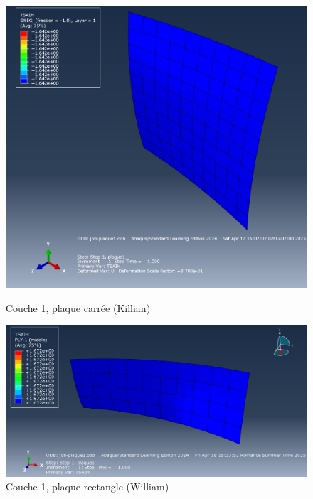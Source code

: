 \documentclass[a4paper,12pt]{article}
\begin{document}
\begin{figure}[h!]
	\centering
	\begin{minipage}[t][0.3\textheight]{0.495\textwidth}
		\centering
		\includegraphics[width=\textwidth]{media/K_P1_L1_12042025.png} %
		\caption{Couche 1, plaque carrée (Killian)}
		\label{fig:image1}
	\end{minipage}
	\hfill
	\begin{minipage}[t][0.3\textheight]{0.495\textwidth}
		\centering
		\includegraphics[width=\textwidth]{media/Couche1_.png} %
		\caption{Couche 1, plaque rectangle (William)}
		\label{fig:image2}
	\end{minipage}
\end{figure}
\end{document}
